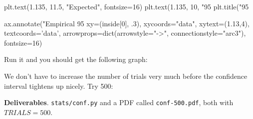 \begin{fullwidth}
{\begin{pyverbatim}
plt.text(1.135, 11.5, "Expected", fontsize=16)
plt.text(1.135, 10, "95%
plt.title("95%

ax.annotate("Empirical 95%
			 xy=(inside[0], .3),
			 xycoords="data",
			 xytext=(1.13,4), textcoords='data',
			 arrowprops=dict(arrowstyle="->",
                            connectionstyle="arc3"),
			 fontsize=16)
\end{pyverbatim}
}

\step Run it and you should get the following graph:


\step  We don't have to increase the number of trials very much before the confidence interval tightens up nicely. Try 500:


\begin{callout}{\bcplume}
{\bf Deliverables}. {\tt stats/conf.py} and a PDF called {\tt conf-500.pdf}, both with $TRIALS=500$.
\end{callout}

\end{fullwidth}

